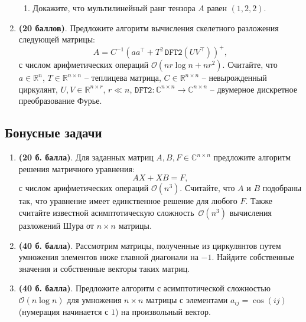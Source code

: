 \documentclass{article}
\newcommand{\prob}[1]{\item \textbf{(#1 баллов)}.}
\begin{document}
\begin{enumerate}
\begin{enumerate}
        \item Докажите, что мультилинейный ранг тензора $A$ равен $(1, 2, 2)$.
    \end{enumerate}
    \prob{20} Предложите алгоритм вычисления скелетного разложения следующей матрицы:
\[
    A = C^{-1}\left(aa^\top + T^2\,\texttt{DFT2}\left(UV^\top\right)\right)^+,
\]
с числом арифметических операций $\mathcal{O}(nr\log n + nr^2)$. Считайте, что $a\in\mathbb{R}^n$, $T\in\mathbb{R}^{n\times n}$ -- теплицева матрица, $C\in\mathbb{R}^{n\times n}$ -- невырожденный циркулянт, $U,V\in\mathbb{R}^{n\times r}$, $r\ll n$, $\texttt{DFT2}\colon \mathbb{C}^{n\times n}\to \mathbb{C}^{n\times n}$ -- двумерное дискретное преобразование Фурье.

\end{enumerate}

\subsection*{Бонусные задачи}


\begin{enumerate}
    \item\textbf{(20 б. балла)}. 
    Для заданных матриц $A,B,F\in\mathbb{C}^{n\times n}$ предложите алгоритм решения матричного уравнения:
    \[
    AX + XB = F,
    \]
    с числом арифметических операций $\mathcal{O}(n^3)$. Считайте, что $A$ и $B$ подобраны так, что уравнение имеет единственное решение для любого $F$. Также считайте известной асимптотическую сложность~$\mathcal{O}(n^3)$ вычисления разложений Шура от $n\times n$ матрицы.
    \item\textbf{(40 б. балла)}. 
    Рассмотрим матрицы, полученные из циркулянтов путем умножения элементов ниже главной диагонали на $-1$. Найдите собственные значения и собственные векторы таких матриц.
    \item \textbf{(40 б. балла)}.
    Предложите алгоритм с асимптотической сложностью $\mathcal{O}(n\log n)$ для умножения $n\times n$ матрицы с элементами $a_{ij} = \cos(ij)$ (нумерация начинается с $1$) на произвольный вектор.
    

\end{enumerate}
\end{document}
